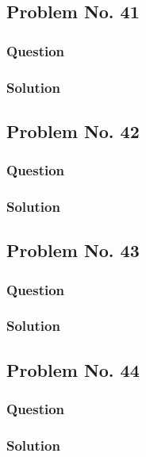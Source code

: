 \documentclass[journal,12pt,twocolumn]{IEEEtran}
\begin{document}
\subsection{Problem No. 41}
\subsubsection{Question}

\subsubsection{Solution}


\subsection{Problem No. 42}
\subsubsection{Question}

\subsubsection{Solution}


\subsection{Problem No. 43}
\subsubsection{Question}

\subsubsection{Solution}


\subsection{Problem No. 44}
\subsubsection{Question}

\subsubsection{Solution}

\end{document}
